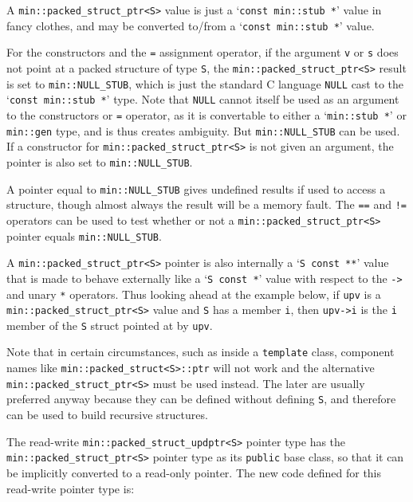 \documentclass[12pt]{article}
\newcommand{\EOL}{\penalty \exhyphenpenalty}
\newcommand{\BRACKETED}[1]{{\tt <#1>}}
\newcommand{\SARG}{\BRACKETED{S}}
\begin{document}
A {\tt min::\EOL packed\_\EOL struct\_\EOL ptr\SARG} value is just
a `{\tt const min::stub~*}' value in fancy clothes, and may be
converted to/from a `{\tt const min::stub~*}' value.

For the constructors and the {\tt =} assignment operator, if the
argument \verb|v| or \verb|s| does not point at a packed structure
of type {\tt S}, the {\tt min::\EOL packed\_\EOL struct\_\EOL ptr\SARG}
result is set to {\tt min::\EOL NULL\_\EOL STUB},
which is just the standard C language \verb|NULL|
cast to the `\verb|const min::stub *|' type.
Note that \verb|NULL| cannot itself be used as an argument to
the constructors or {\tt =} operator, as it is
convertable to either a `\verb|min::stub *|'
or \verb|min::gen| type, and is thus creates ambiguity.
But {\tt min::\EOL NULL\_\EOL STUB} can be used.
If a constructor for {\tt min::\EOL packed\_\EOL struct\_\EOL ptr\SARG}
is not given an argument, the pointer is also set to
{\tt min::\EOL NULL\_\EOL STUB}.

A pointer equal to
{\tt min::\EOL NULL\_\EOL STUB} gives undefined results if
used to access a structure,
though almost always the result will be a memory fault.
The {\tt ==} and {\tt !=} operators can be used to test whether
or not a {\tt min::\EOL packed\_\EOL struct\_\EOL ptr\SARG} pointer
equals {\tt min::\EOL NULL\_\EOL STUB}.

A {\tt min::\EOL packed\_\EOL struct\_\EOL ptr\SARG} pointer is also
internally a `\verb|S const **|' value that is made to behave externally like a
`\verb|S const *|' value with respect to the \verb|->| and
unary \verb|*| operators.  Thus looking ahead at the example below,
if \verb|upv| is a
{\tt min::\EOL packed\_\EOL struct\_\EOL ptr\SARG} value
and \verb|S| has a member \verb|i|, then \verb|upv->i| is the \verb|i|
member of the \verb|S| struct pointed at by \verb|upv|.

Note that in certain
circumstances, such as inside a {\tt template} class,
component names like {\tt min::\EOL packed\_\EOL struct<S>::ptr} will not work
and the alternative {\tt min::\EOL packed\_\EOL struct\_\EOL ptr<S>}
must be used instead.  The later are usually preferred anyway because
they can be defined without defining \verb|S|, and therefore can be
used to build recursive structures.

The read-write {\tt min::\EOL packed\_\EOL struct\_\EOL updptr\SARG}
pointer type has the
{\tt min::\EOL packed\_\EOL struct\_\EOL ptr\SARG} pointer type as its
{\tt public} base class, so that it can be implicitly converted to
a read-only pointer.  The new code defined for this read-write
pointer type is:
\end{document}
